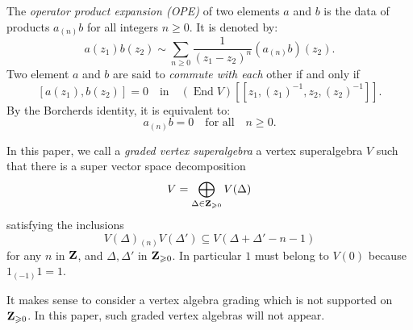The \emph{operator product expansion (OPE)} of two elements $a$ and $b$ is the data of products $a_{(n)} b$ for all integers $n \geqslant 0$. It is denoted by:
\[ a(z_1) b(z_2) \sim \sum_{n \geqslant 0} \frac{1}{(z_1 - z_2)^n} (a_{(n)} b)(z_2). \]
Two element $a$ and $b$ are said to \emph{commute with each} other if and only if \[  [a(z_1), b(z_2)] = 0 \quad \text{in} \quad (\operatorname{End} V)[\![z_1, (z_1)^{-1}, z_2, (z_2)^{-1}]\!]. \]
By the Borcherds identity, it is equivalent to:
\[ a_{(n)} b = 0\quad \text{for all} \quad n \geqslant 0. \]


%

In this paper, we call a \emph{graded vertex superalgebra} a vertex superalgebra $V$ such that there is a super vector space decomposition
\[ V = \bigoplus_{\Delta \in \mathbf{Z}_{\geqslant 0}} V(\Delta) \]
satisfying the inclusions
\[ V(\Delta){}_{(n)} V(\Delta') \subseteq V(\Delta + \Delta' - n - 1) \]
for any $n$ in $\mathbf{Z}$, and $\Delta, \Delta'$ in $\mathbf{Z}_{\geqslant 0}$. In particular $1$ must belong to $V(0)$ because $1_{(-1)}1 = 1$.

\begin{remark}
	It makes sense to consider a vertex algebra grading which is not supported on $\mathbf{Z}_{\geqslant 0}$. In this paper, such graded vertex algebras will not appear.
\end{remark}

